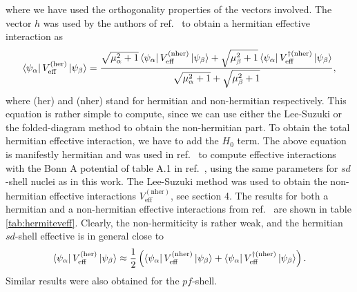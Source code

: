 where we have used the orthogonality properties of the vectors
involved. The vector $h$ was used by the authors of ref.\ \cite{kuo93}
to obtain a hermitian effective interaction as
\begin{equation}
   \left\langle \psi_{\alpha} \right|V_{\mathrm{eff}}^{\mathrm{(her)}}\left| \psi_{\beta} \right\rangle=
   \frac{\sqrt{\mu_{\alpha}^2+1}\left\langle \psi_{\alpha} \right|
   V_{\mathrm{eff}}^{\mathrm{(nher)}}\left| \psi_{\beta} \right\rangle
   +\sqrt{\mu_{\beta}^2+1}\left\langle \psi_{\alpha} \right|
   V_{\mathrm{eff}}^{\dagger\mathrm{(nher)}}\left| \psi_{\beta} \right\rangle   }
   {\sqrt{\mu_{\alpha}^2+1}+\sqrt{\mu_{\beta}^2+1} },
\end{equation}
where (her) and (nher) stand for hermitian and non-hermitian
respectively. This equation is rather simple to compute, since
we can use either the Lee-Suzuki or the folded-diagram method
to obtain the non-hermitian part.
To obtain the total hermitian effective interaction, we have to
add the $H_0$ term. The above equation is manifestly hermitian and
was used in ref.\ \cite{kuo93} to compute effective
interactions with the Bonn A potential of table A.1 in ref.\
\cite{mac89}, using the same parameters for $sd$-shell nuclei as in this
work.
The Lee-Suzuki method was used to obtain
the non-hermitian effective interactions
$V_{\mathrm{eff}}^{\mathrm{(nher)}}$, see section 4. The results
for both a hermitian and a non-hermitian effective interactions
from ref.\ \cite{kuo93} are shown in table \ref{tab:hermiteveff}.
Clearly, the non-hermiticity is rather weak, 
and the hermitian  $sd$-shell
effective is in general close to
\begin{equation}
   \left\langle \psi_{\alpha} \right|V_{\mathrm{eff}}^{\mathrm{(her)}}\left| \psi_{\beta} \right\rangle
   \approx\frac{1}{2}\left(\left\langle \psi_{\alpha} \right|
    V_{\mathrm{eff}}^{\mathrm{(nher)}}
    \left| \psi_{\beta} \right\rangle
   +\left\langle \psi_{\alpha} \right|V_{\mathrm{eff}}^{\dagger\mathrm{(nher)}}
   \left| \psi_{\beta} \right\rangle\right).
\end{equation}
Similar results were also obtained for the $pf$-shell.
